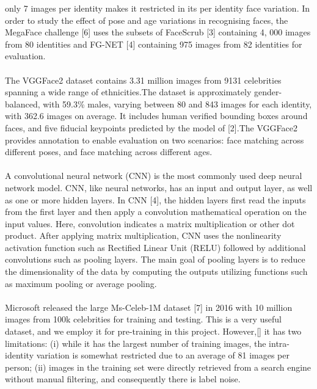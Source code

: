 only 7 images per identity makes it restricted in its per identity face variation. In order to study the effect of pose and age
variations in recognising faces, the MegaFace challenge [6]
uses the subsets of FaceScrub [3] containing 4, 000 images
from 80 identities and FG-NET [4] containing 975 images
from 82 identities for evaluation.
\\\\
The VGGFace2 dataset contains 3.31 million images from
9131 celebrities spanning a wide range of ethnicities.The dataset is approximately
gender-balanced, with 59.3\% males, varying between 80
and 843 images for each identity, with 362.6 images on
average. It includes human verified bounding boxes around
faces, and five fiducial keypoints predicted by the model
of [2].The VGGFace2 provides annotation to enable evaluation
on two scenarios: face matching across different poses, and
face matching across different ages.
\\\\
A convolutional neural network (CNN) is the most commonly used deep neural network model. CNN, like neural networks, has an input and output layer, as well as one or more hidden layers. In CNN [4], the hidden layers first read the inputs from the first layer and then apply a convolution mathematical operation on the input values. Here, convolution indicates a matrix multiplication or other dot product. After applying matrix multiplication, CNN uses the nonlinearity activation function such as Rectified Linear Unit (RELU) followed by additional convolutions such as pooling layers. The main goal of pooling layers is to reduce the dimensionality of the data by computing the outputs utilizing functions such as maximum pooling or average pooling.
\\\\
Microsoft released the large Ms-Celeb-1M dataset [7]
in 2016 with 10 million images from 100k celebrities for training and testing. This is a very useful dataset, and we
employ it for pre-training in this project. However,[] it has two
limitations: (i) while it has the largest number of training
images, the intra-identity variation is somewhat restricted
due to an average of 81 images per person; (ii) images
in the training set were directly retrieved from a search
engine without manual filtering, and consequently there is
label noise.